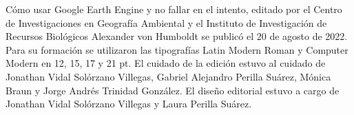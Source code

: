 \documentclass[
  12pt,
  letterpaper,
  twoside]{book}
\renewcommand\headrulewidth{0pt}
\begin{document}
\backmatter
\renewcommand\headrulewidth{0pt}
\pagestyle{empty}
  \fancyhf{}
\printindex{}

\newpage
{}
\vspace*{\fill}
\begin{center}
Cómo usar Google Earth Engine y no fallar en el intento, editado por el Centro de Investigaciones en Geografía Ambiental y el Instituto de Investigación de Recursos Biológicos Alexander von Humboldt se publicó el 20 de agosto de 2022. Para su formación se utilizaron las tipografías Latin Modern Roman y Computer Modern en 12, 15, 17 y 21 pt. El cuidado de la edición estuvo al cuidado de Jonathan Vidal Solórzano Villegas, Gabriel Alejandro Perilla Suárez, Mónica Braun y Jorge Andrés Trinidad González. El diseño editorial estuvo a cargo de Jonathan Vidal Solórzano Villegas y Laura Perilla Suárez.
\end{center}
\vspace*{\fill}
\end{document}
